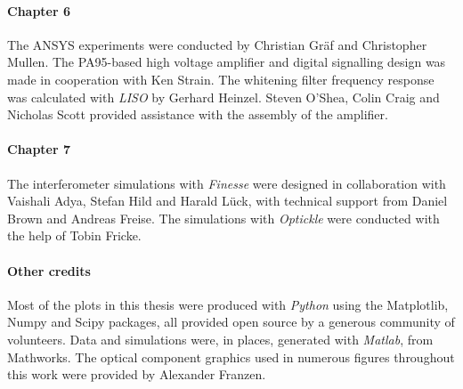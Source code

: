 \paragraph{Chapter 6}
The ANSYS experiments were conducted by Christian Gr\"{a}f and Christopher Mullen. The PA95-based high voltage amplifier and digital signalling design was made in cooperation with Ken Strain. The whitening filter frequency response was calculated with \emph{LISO} by Gerhard Heinzel. Steven O'Shea, Colin Craig and Nicholas Scott provided assistance with the assembly of the amplifier.

\paragraph{Chapter 7}
The interferometer simulations with \emph{Finesse} were designed in collaboration with Vaishali Adya, Stefan Hild and Harald L\"{u}ck, with technical support from Daniel Brown and Andreas Freise. The simulations with \emph{Optickle} were conducted with the help of Tobin Fricke.

\paragraph{Other credits}
Most of the plots in this thesis were produced with \emph{Python} using the Matplotlib, Numpy and Scipy packages, all provided open source by a generous community of volunteers. Data and simulations were, in places, generated with \emph{Matlab}, from Mathworks. The optical component graphics used in numerous figures throughout this work were provided by Alexander Franzen.